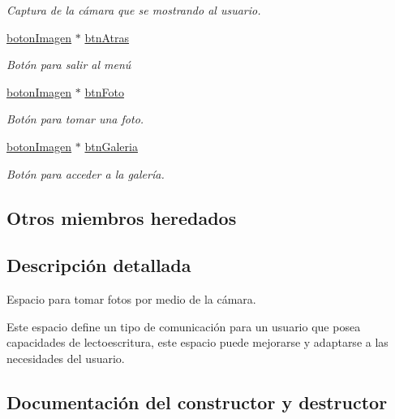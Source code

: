\begin{DoxyCompactItemize}
\begin{DoxyCompactList}\small\item\em Captura de la cámara que se mostrando al usuario. \end{DoxyCompactList}\item 
\hyperlink{classboton_imagen}{boton\+Imagen} $\ast$ \hyperlink{classespacio_camara_a4d7caffe8a3090acf04dc78ed91e923c}{btn\+Atras}
\begin{DoxyCompactList}\small\item\em Botón para salir al menú \end{DoxyCompactList}\item 
\hyperlink{classboton_imagen}{boton\+Imagen} $\ast$ \hyperlink{classespacio_camara_a0a33e016b145a3ad2723d6d120260f48}{btn\+Foto}
\begin{DoxyCompactList}\small\item\em Botón para tomar una foto. \end{DoxyCompactList}\item 
\hyperlink{classboton_imagen}{boton\+Imagen} $\ast$ \hyperlink{classespacio_camara_a3d110b2810a8ba6579857dd7f8a6fe22}{btn\+Galeria}
\begin{DoxyCompactList}\small\item\em Botón para acceder a la galería. \end{DoxyCompactList}\end{DoxyCompactItemize}
\subsection*{Otros miembros heredados}


\subsection{Descripción detallada}
Espacio para tomar fotos por medio de la cámara. 

Este espacio define un tipo de comunicación para un usuario que posea capacidades de lectoescritura, este espacio puede mejorarse y adaptarse a las necesidades del usuario. 

\subsection{Documentación del constructor y destructor}
\hypertarget{classespacio_camara_adf85b2cd673cb9eafee260e14b9c9f41}{}
